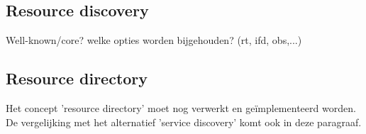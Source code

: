 \subsection{Resource discovery}\label{discovery}

Well-known/core? welke opties worden bijgehouden? (rt, ifd, obs,...)

\subsection{Resource directory} %

Het concept 'resource directory' moet nog verwerkt en ge\"{i}mplementeerd worden. De vergelijking met het alternatief 'service discovery' komt ook in deze paragraaf.
